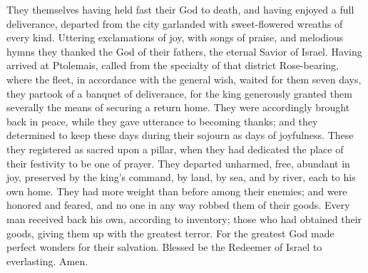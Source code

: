 {They themselves having held fast their God to death, and having enjoyed a full deliverance, departed from the city garlanded with sweet-flowered wreaths of every kind. Uttering exclamations of joy, with songs of praise, and melodious hymns they thanked the God of their fathers, the eternal Savior of Israel.
Having arrived at Ptolemais, called from the specialty of that district Rose-bearing, where the fleet, in accordance with the general wish, waited for them seven days,
they partook of a banquet of deliverance, for the king generously granted them severally the means of securing a return home.
They were accordingly brought back in peace, while they gave utterance to becoming thanks; and they determined to keep these days during their sojourn as days of joyfulness.
These they registered as sacred upon a pillar, when they had dedicated the place of their festivity to be one of prayer. They departed unharmed, free, abundant in joy, preserved by the king’s command, by land, by sea, and by river, each to his own home.
They had more weight than before among their enemies; and were honored and feared, and no one in any way robbed them of their goods.
Every man received back his own, according to inventory; those who had obtained their goods, giving them up with the greatest terror. For the greatest God made perfect wonders for their salvation.
Blessed be the Redeemer of Israel to everlasting. Amen.
\par }